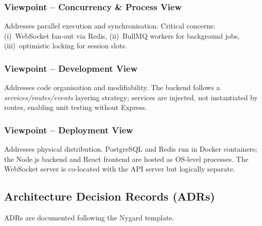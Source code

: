 \documentclass[12pt,a4paper]{article}
\begin{document}
\subsubsection{Viewpoint -- Concurrency \& Process View}
Addresses parallel execution and synchronisation. Critical concerns: (i)~WebSocket fan-out via Redis, (ii)~BullMQ workers for background jobs, (iii)~optimistic locking for session slots.

\subsubsection{Viewpoint -- Development View}
Addresses code organisation and modifiability. The backend follows a \textit{services/routes/events} layering strategy; services are injected, not instantiated by routes, enabling unit testing without Express.

\subsubsection{Viewpoint -- Deployment View}
Addresses physical distribution. PostgreSQL and Redis run in Docker containers; the Node.js backend and React frontend are hosted as OS-level processes. The WebSocket server is co-located with the API server but logically separate.

\subsection{Architecture Decision Records (ADRs)}

ADRs are documented following the Nygard template.
\end{document}
